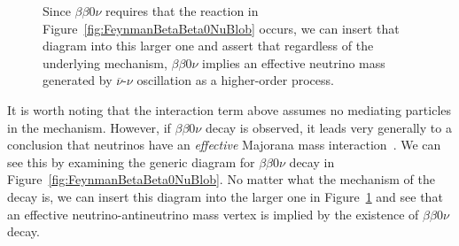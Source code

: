 \begin{figure}
\begin{center}
\end{center}
\caption{Since $\beta\beta 0\nu$ requires that the reaction in Figure~\ref{fig:FeynmanBetaBeta0NuBlob} occurs, we can insert that diagram into this larger one and assert that regardless of the underlying mechanism, $\beta\beta 0\nu$ implies an effective neutrino mass generated by $\overline{\nu}$-$\nu$ oscillation as a higher-order process.}
\label{fig:FeynmanBetaBeta0NuImplication}
\end{figure}

It is worth noting that the interaction term above assumes no mediating particles in the mechanism.  However, if $\beta\beta 0\nu$ decay is observed, it leads very generally to a conclusion that neutrinos have an \emph{effective} Majorana mass interaction~\cite{BlackBoxTheorem}.  We can see this by examining the generic diagram for $\beta\beta 0\nu$ decay in Figure~\ref{fig:FeynmanBetaBeta0NuBlob}.  No matter what the mechanism of the decay is, we can insert this diagram into the larger one in Figure~\ref{fig:FeynmanBetaBeta0NuImplication} and see that an effective neutrino-antineutrino mass vertex is implied by the existence of $\beta\beta 0\nu$ decay.

